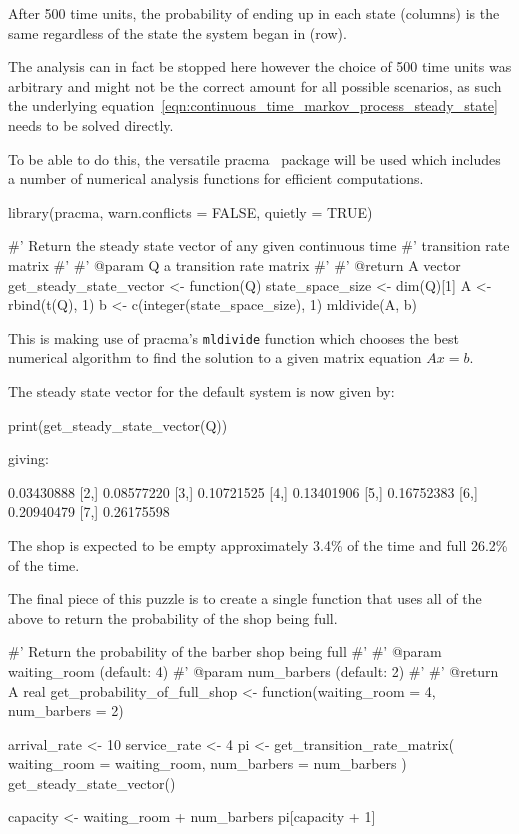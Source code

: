 After 500 time units, the probability of ending up in each state (columns) is
the same regardless of the state the system began in (row).

The analysis can in fact be stopped here
however the choice of 500 time units was arbitrary and might not be the correct
amount for all possible scenarios, as such the
underlying equation~\ref{eqn:continuous_time_markov_process_steady_state}
needs to be solved directly.

To be able to do this, the versatile pracma~\cite{borchers2021pracma} package
will be used which includes a number of numerical analysis functions for
efficient computations.

\begin{Rin}
library(pracma, warn.conflicts = FALSE, quietly = TRUE)

#' Return the steady state vector of any given continuous time
#' transition rate matrix
#'
#' @param Q a transition rate matrix
#'
#' @return A vector
get_steady_state_vector <- function(Q){
  state_space_size <- dim(Q)[1]
  A <- rbind(t(Q), 1)
  b <- c(integer(state_space_size), 1)
  mldivide(A, b)
}
\end{Rin}

This is making use of pracma's \texttt{mldivide} function
which chooses the best numerical algorithm to find the solution to a given
matrix equation \(Ax=b\).

The steady state vector for the default system is now given by:

\begin{Rin}
print(get_steady_state_vector(Q))
\end{Rin}

giving:

\begin{Rout}
           [,1]
[1,] 0.03430888
[2,] 0.08577220
[3,] 0.10721525
[4,] 0.13401906
[5,] 0.16752383
[6,] 0.20940479
[7,] 0.26175598
\end{Rout}

The shop is expected to be empty approximately 3.4\% of the time
and full 26.2\% of the time.

The final piece of this puzzle is to create a single function that uses all of
the above to return the probability of the shop being full.

\begin{Rin}
#' Return the probability of the barber shop being full
#'
#' @param waiting_room (default: 4)
#' @param num_barbers (default: 2)
#'
#' @return A real
get_probability_of_full_shop <- function(waiting_room = 4,
                                         num_barbers = 2){
  arrival_rate <- 10
  service_rate <- 4
  pi <- get_transition_rate_matrix(
    waiting_room = waiting_room,
    num_barbers = num_barbers
    ) %
    get_steady_state_vector()

  capacity <- waiting_room + num_barbers
  pi[capacity + 1]
}
\end{Rin}

